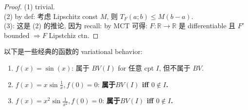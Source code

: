 \documentclass{qlnotes-export}
\begin{document}
\begin{proof}

(1) trivial.\\
(2) by def: 考虑 Lipschitz const \(M\), 则 \(T_{F}(a;b) \leq M(b - a)\).\\
(3): 这是 (2) 的推论, 因为 recall: by MCT 可得: \(F:{\mathbb{R}}\rightarrow{\mathbb{R}}\) 是 differentiable 且 \(F'\) bounded \(\Longrightarrow F\) Lipstchiz ctn.

\end{proof}

\begin{proposition}\label{prop-12-differentiation-on-real-spaces-proposition-003}

以下是一些经典的函数的 variational behavior:

\begin{enumerate}
\item
  \(f(x) = \sin(x)\): 属于 \(BV(I)\) for 任意 cpt \(I\), 但不属于 \(BV\).
\item
  \(f(x) = x\sin\frac{1}{x},f(0) = 0\): \textbf{属于\(BV(I)\) iff \(0 \notin I\).}
\item
  \(f(x) = x^{2}\sin\frac{1}{x^{2}},f(0) = 0\): \textbf{属于\(BV(I)\) iff \(0 \notin I\).}
\end{enumerate}

\end{proposition}
\end{document}
